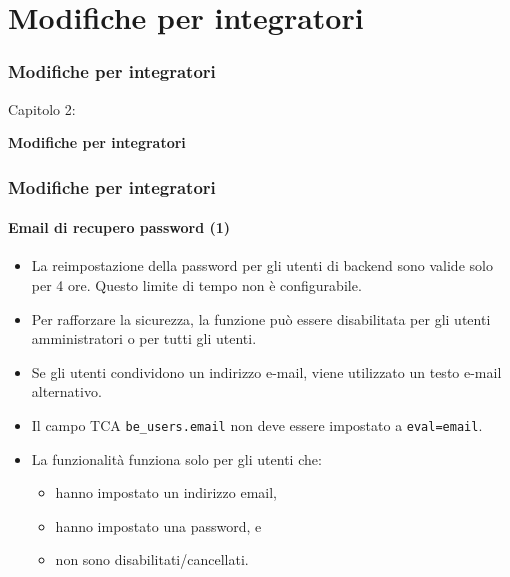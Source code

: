 %

\section{Modifiche per integratori}
\begin{frame}[fragile]
	\frametitle{Modifiche per integratori}

	\begin{center}\huge{Capitolo 2:}\end{center}
	\begin{center}\huge{\color{typo3darkgrey}\textbf{Modifiche per integratori}}\end{center}

\end{frame}


\begin{frame}[fragile]
	\frametitle{Modifiche per integratori}
	\framesubtitle{Email di recupero password (1)}

	\begin{itemize}

		\item La reimpostazione della password per gli utenti di backend sono valide solo per 4 ore.\newline
			Questo limite di tempo non è configurabile.
		\item Per rafforzare la sicurezza, la funzione può essere disabilitata per gli utenti amministratori o per tutti gli utenti.
		\item Se gli utenti condividono un indirizzo e-mail, viene utilizzato un testo e-mail alternativo.
		\item Il campo TCA \texttt{be\_users.email} non deve essere impostato a \texttt{eval=email}.

		\item La funzionalità funziona solo per gli utenti che:
			\begin{itemize}
				\item hanno impostato un indirizzo email,
				\item hanno impostato una password, e
				\item non sono disabilitati/cancellati.
			\end{itemize}

	\end{itemize}

\end{frame}

